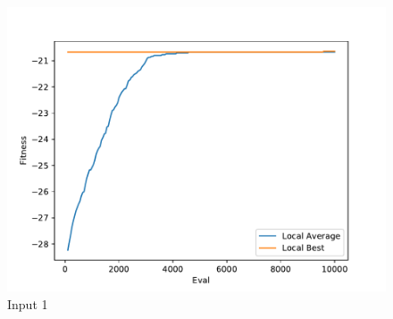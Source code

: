\documentclass{standalone}
\begin{document}
\begin{figure}[!htb]
	\caption{Input 1}
	\label{fig:graph_1061}
	\includegraphics[width=\textwidth]{../graphs/graphs/1061.pdf}
\end{figure}
\end{document}
